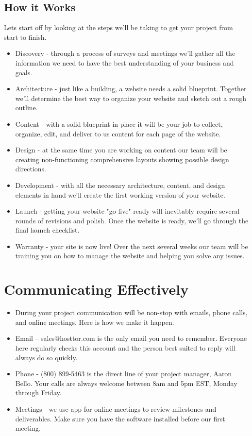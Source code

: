 \documentclass[12pt]{report}
\begin{document}
\subsection{How it Works}
Lets start off by looking at the steps we'll be taking to get your project from start to finish.
\begin{itemize}
\item Discovery - through a process of surveys and meetings we'll gather all the information we need to have the best understanding of your business and goals.
\item Architecture - just like a building, a website needs a solid blueprint. Together we'll determine the best way to organize your website and sketch out a rough outline.
\item Content - with a solid blueprint in place it will be your job to collect, organize, edit, and deliver to us content for each page of the website.
\item Design - at the same time you are working on content our team will be creating non-functioning comprehensive layouts showing possible design directions.
\item Development - with all the necessary architecture, content, and design elements in hand we'll create the first working version of your website.
\item Launch - getting your website "go live" ready will inevitably require several rounds of revisions and polish. Once the website is ready, we'll go through the final launch checklist.
\item Warranty - your site is now live! Over the next several weeks our team will be training you on how to manage the website and helping you solve any issues.
\end{itemize}


\section{Communicating Effectively}
\begin{itemize}
\item During your project communication will be non-stop with emails, phone calls, and online meetings. Here is how we make it happen.
\item Email – sales@hosttor.com is the only email you need to remember. Everyone here regularly checks this account and the person best suited to reply will always do so quickly.
\item Phone - (800) 899-5463 is the direct line of your project manager, Aaron Bello. Your calls are always welcome between 8am and 5pm EST, Monday through Friday.
\item Meetings - we use app for online meetings to review milestones and deliverables. Make sure you have the software installed before our first meeting.
\end{itemize}
\end{document}
